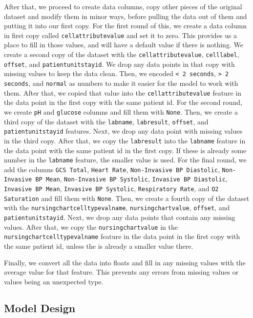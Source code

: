 \documentclass{article}
\begin{document}
After that, we proceed to create data columns, copy other pieces of the original dataset and modify them in minor ways, before pulling the data out of them and putting it into our first copy. For the first round of this, we create a data column in first copy called \texttt{cellattributevalue} and set it to zero. This provides us a place to fill in those values, and will have a default value if there is nothing. We create a second copy of the dataset with the \texttt{cellattributevalue}, \texttt{celllabel}, \texttt{offset}, and \texttt{patientunitstayid}. We drop any data points in that copy with missing values to keep the data clean. Then, we encoded \texttt{< 2 seconds}, \texttt{> 2 seconds}, and \texttt{normal} as numbers to make it easier for the model to work with them. After that, we copied that value into the \texttt{cellattributevalue} feature in the data point in the first copy with the same patient id. For the second round, we create \texttt{pH} and \texttt{glucose} columns and fill them with \texttt{None}. Then, we create a third copy of the dataset with the \texttt{labname}, \texttt{labresult}, \texttt{offset}, and \texttt{patientunitstayid} features. Next, we drop any data point with missing values in the third copy. After that, we copy the \texttt{labresult} into the \texttt{labname} feature in the data point with the same patient id in the first copy. If these is already some number in the \texttt{labname} feature, the smaller value is used. For the final round, we add the columns \texttt{GCS Total}, \texttt{Heart Rate}, \texttt{Non-Invasive BP Diastolic}, \texttt{Non-Invasive BP Mean}, \texttt{Non-Invasive BP Systolic}, \texttt{Invasive BP Diastolic}, \texttt{Invasive BP Mean}, \texttt{Invasive BP Systolic}, \texttt{Respiratory Rate}, and \texttt{O2 Saturation} and fill them with \texttt{None}. Then, we create a fourth copy of the dataset with the \texttt{nursingchartcelltypevalname}, \texttt{nursingchartvalue}, \texttt{offset}, and \texttt{patientunitstayid}. Next, we drop any data points that contain any missing values. After that, we copy the \texttt{nursingchartvalue} in the \texttt{nursingchartcelltypevalname} feature in the data point in the first copy with the same patient id, unless the is already a smaller value there. 

Finally, we convert all the data into floats and fill in any missing values with the average value for that feature. This prevents any errors from missing values or values being an unexpected type. 

\subsection{Model Design}
\end{document}
